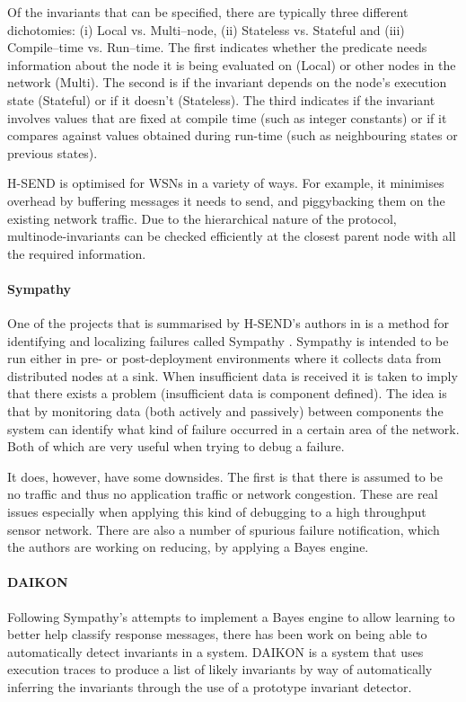 Of the invariants that can be specified, there are typically three different dichotomies: (i) Local vs. Multi--node, (ii) Stateless vs. Stateful and (iii) Compile--time vs. Run--time. The first indicates whether the predicate needs information about the node it is being evaluated on (Local) or other nodes in the network (Multi). The second is if the invariant depends on the node's execution state (Stateful) or if it doesn't (Stateless). The third indicates if the invariant involves values that are fixed at compile time (such as integer constants) or if it compares against values obtained during run-time (such as neighbouring states or previous states).

H-SEND is optimised for WSNs in a variety of ways. For example, it minimises overhead by buffering messages it needs to send, and piggybacking them on the existing network traffic. Due to the hierarchical nature of the protocol, multinode-invariants can be checked efficiently at the closest parent node with all the required information.

\paragraph{Sympathy} One of the projects that is summarised by H-SEND's authors \citeauthor{herbert2007adaptive} in \cite{herbert2007adaptive} is a method for identifying and localizing failures called Sympathy \cite{ramanathan2005sympathy}. Sympathy is intended to be run either in pre- or post-deployment environments where it collects data from distributed nodes at a sink. When insufficient data is received it is taken to imply that there exists a problem (insufficient data is component defined). The idea is that by monitoring data (both actively and passively) between components the system can identify what kind of failure occurred in a certain area of the network. Both of which are very useful when trying to debug a failure.

It does, however, have some downsides. The first is that there is assumed to be no traffic and thus no application traffic or network congestion. These are real issues especially when applying this kind of debugging to a high throughput sensor network. There are also a number of spurious failure notification, which the authors are working on reducing, by applying a Bayes engine.

\paragraph{DAIKON} Following Sympathy's attempts to implement a Bayes engine to allow learning to better help classify response messages, there has been work on being able to automatically detect invariants in a system. DAIKON \cite{daikon} is a system that uses execution traces to produce a list of likely invariants by way of automatically inferring the invariants through the use of a prototype invariant detector.

